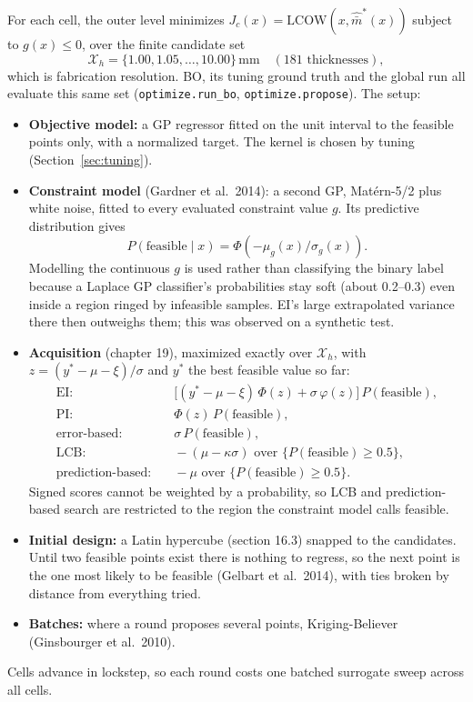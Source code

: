 \documentclass[11pt]{article}
\newcommand{\code}[1]{\texttt{#1}}
\begin{document}
For each cell, the outer level minimizes
$J_c(x) = \mathrm{LCOW}(x, \hat{\bar m}^\ast(x))$ subject to $g(x) \le 0$, over the
finite candidate set
\begin{equation}
\mathcal{X}_h = \{1.00, 1.05, \dots, 10.00\}\,\si{\milli\metre} \quad (181 \text{ thicknesses}),
\end{equation}
which is fabrication resolution. BO, its tuning ground truth and the global run all evaluate
this same set (\code{optimize.run\_bo}, \code{optimize.propose}). The setup:
\begin{itemize}
\item \textbf{Objective model:} a GP regressor fitted on the unit interval to the feasible
points only, with a normalized target. The kernel is chosen by tuning (Section~\ref{sec:tuning}).
\item \textbf{Constraint model} (Gardner et al.\ 2014): a second GP, Mat\'ern-5/2 plus white
noise, fitted to every evaluated constraint value $g$. Its predictive distribution gives
\begin{equation}
P(\text{feasible} \mid x) = \Phi\!\left(-\mu_g(x)/\sigma_g(x)\right).
\end{equation}
Modelling the continuous $g$ is used rather than classifying the binary label because a
Laplace GP classifier's probabilities stay soft (about 0.2--0.3) even inside a region ringed
by infeasible samples. EI's large extrapolated variance there then outweighs them; this was
observed on a synthetic test.
\item \textbf{Acquisition} (chapter 19), maximized exactly over $\mathcal{X}_h$, with
$z = (y^\ast - \mu - \xi)/\sigma$ and $y^\ast$ the best feasible value so far:
\begin{align}
\text{EI:} &\quad \bigl[(y^\ast - \mu - \xi)\,\Phi(z) + \sigma\,\varphi(z)\bigr]\, P(\text{feasible}), \\
\text{PI:} &\quad \Phi(z)\, P(\text{feasible}), \\
\text{error-based:} &\quad \sigma\, P(\text{feasible}), \\
\text{LCB:} &\quad -(\mu - \kappa\sigma) \text{ over } \{P(\text{feasible}) \ge 0.5\}, \\
\text{prediction-based:} &\quad -\mu \text{ over } \{P(\text{feasible}) \ge 0.5\}.
\end{align}
Signed scores cannot be weighted by a probability, so LCB and prediction-based search are
restricted to the region the constraint model calls feasible.
\item \textbf{Initial design:} a Latin hypercube (section 16.3) snapped to the candidates.
Until two feasible points exist there is nothing to regress, so the next point is the one
most likely to be feasible (Gelbart et al.\ 2014), with ties broken by distance from
everything tried.
\item \textbf{Batches:} where a round proposes several points, Kriging-Believer (Ginsbourger
et al.\ 2010).
\end{itemize}
Cells advance in lockstep, so each round costs one batched surrogate sweep across all cells.
\end{document}

